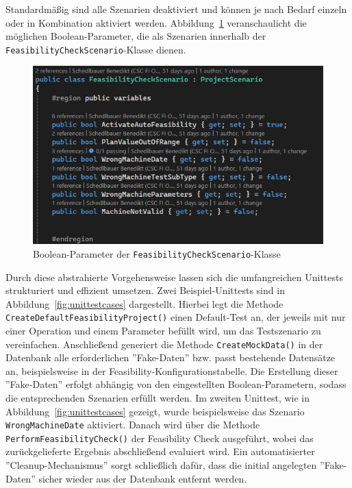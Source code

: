 Standardmäßig sind alle Szenarien deaktiviert und können je nach Bedarf einzeln oder in Kombination aktiviert werden. Abbildung~\ref{fig:unittests-parameters} veranschaulicht die möglichen Boolean-Parameter, die als Szenarien innerhalb der \texttt{FeasibilityCheckScenario}-Klasse dienen.

\begin{figure}[!htb]
    \centering
    \includegraphics[width=1\textwidth]{bilder/unittests-parameters.png}
    \caption{Boolean-Parameter der \texttt{FeasibilityCheckScenario}-Klasse}
    \label{fig:unittests-parameters}
\end{figure}

Durch diese abstrahierte Vorgehensweise lassen sich die umfangreichen Unittests strukturiert und effizient umsetzen. Zwei Beispiel-Unittests sind in Abbildung~\ref{fig:unittestcases} dargestellt. Hierbei legt die Methode \texttt{CreateDefaultFeasibilityProject()} einen Default-Test an, der jeweils mit nur einer Operation und einem Parameter befüllt wird, um das Testszenario zu vereinfachen. Anschließend generiert die Methode \texttt{CreateMockData()} in der Datenbank alle erforderlichen ''Fake-Daten'' bzw. passt bestehende Datensätze an, beispielsweise in der Feasibility-Konfigurationstabelle. Die Erstellung dieser ''Fake-Daten'' erfolgt abhängig von den eingestellten Boolean-Parametern, sodass die entsprechenden Szenarien erfüllt werden. Im zweiten Unittest, wie in Abbildung~\ref{fig:unittestcases} gezeigt, wurde beispielsweise das Szenario \texttt{WrongMachineDate} aktiviert. Danach wird über die Methode \texttt{PerformFeasibilityCheck()} der Feasibility Check ausgeführt, wobei das zurückgelieferte Ergebnis abschließend evaluiert wird. Ein automatisierter ''Cleanup-Mechanismus'' sorgt schließlich dafür, dass die initial angelegten ''Fake-Daten'' sicher wieder aus der Datenbank entfernt werden.

